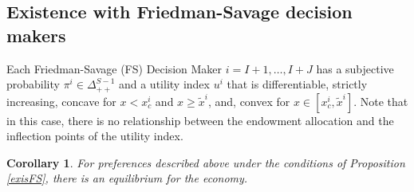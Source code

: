 \documentclass[pdftex]{article}
\numberwithin{equation}{section}
\theoremstyle{th}
\newtheorem{cor}{{Corollary}}%
\newtheorem{proof lemma}{{Proof Lemma}.}
\theoremstyle{definition}
\begin{document}
{\subsection{Existence with Friedman-Savage decision makers}



Each Friedman-Savage (FS) Decision Maker $i=I+1,\dots,I+J$ has a subjective probability $\pi^i\in\Delta^{S-1}_{++}$ and a utility index ${u^i}$  that is differentiable, strictly increasing, concave for $x<{x^i_{c}}$ and $x\geq\tilde{x}^i$, and, convex for $x\in\left[x^i_{c},\tilde{x}^i\right]$. Note that in this case, there is no relationship between the endowment allocation and the inflection points of the utility index.

%
%

\begin{cor}
\label{corollary}
{For preferences described above under the conditions of Proposition \ref{exisFS}, there is an equilibrium for the economy.}
\end{cor}



}
\end{document}
